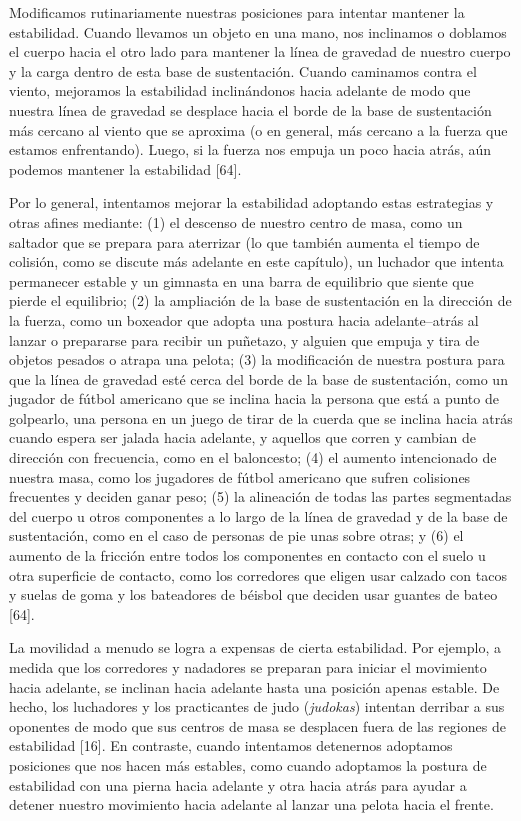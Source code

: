 \documentclass[12pt]{book}
\begin{document}
Modificamos rutinariamente nuestras posiciones para intentar mantener la estabilidad. Cuando llevamos un objeto en una mano, nos inclinamos o doblamos el cuerpo hacia el otro lado para mantener la línea de gravedad de nuestro cuerpo y la carga dentro de esta base de sustentación. Cuando caminamos contra el viento, mejoramos la estabilidad inclinándonos hacia adelante de modo que nuestra línea de gravedad se desplace hacia el borde de la base de sustentación más cercano al viento que se aproxima (o en general, más cercano a la fuerza que estamos enfrentando). Luego, si la fuerza nos empuja un poco hacia atrás, aún podemos mantener la estabilidad [64].

Por lo general, intentamos mejorar la estabilidad adoptando estas estrategias y otras afines mediante: (1) el descenso de nuestro centro de masa, como un saltador que se prepara para aterrizar (lo que también aumenta el tiempo de colisión, como se discute más adelante en este capítulo), un luchador que intenta permanecer estable y un gimnasta en una barra de equilibrio que siente que pierde el equilibrio; (2) la ampliación de la base de sustentación en la dirección de la fuerza, como un boxeador que adopta una postura hacia adelante--atrás al lanzar o prepararse para recibir un puñetazo, y alguien que empuja y tira de objetos pesados o atrapa una pelota; (3) la modificación de nuestra postura para que la línea de gravedad esté cerca del borde de la base de sustentación, como un jugador de fútbol americano que se inclina hacia la persona que está a punto de golpearlo, una persona en un juego de tirar de la cuerda que se inclina hacia atrás cuando espera ser jalada hacia adelante, y aquellos que corren y cambian de dirección con frecuencia, como en el baloncesto; (4) el aumento intencionado de nuestra masa, como los jugadores de fútbol americano que sufren colisiones frecuentes y deciden ganar peso; (5) la alineación de todas las partes segmentadas del cuerpo u otros componentes a lo largo de la línea de gravedad y de la base de sustentación, como en el caso de personas de pie unas sobre otras; y (6) el aumento de la fricción entre todos los componentes en contacto con el suelo u otra superficie de contacto, como los corredores que eligen usar calzado con tacos y suelas de goma y los bateadores de béisbol que deciden usar guantes de bateo [64].

La movilidad a menudo se logra a expensas de cierta estabilidad. Por ejemplo, a medida que los corredores y nadadores se preparan para iniciar el movimiento hacia adelante, se inclinan hacia adelante hasta una posición apenas estable. De hecho, los luchadores y los practicantes de judo (\textit{judokas}) intentan derribar a sus oponentes de modo que sus centros de masa se desplacen fuera de las regiones de estabilidad [16]. En contraste, cuando intentamos detenernos adoptamos posiciones que nos hacen más estables, como cuando adoptamos la postura de estabilidad con una pierna hacia adelante y otra hacia atrás para ayudar a detener nuestro movimiento hacia adelante al lanzar una pelota hacia el frente.
\end{document}
